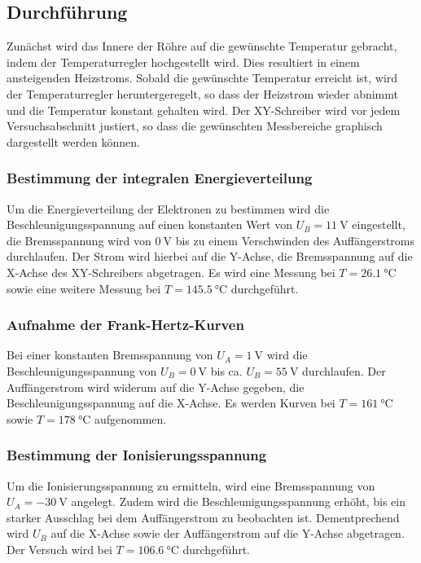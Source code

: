 \subsection{Durchführung}
\label{sec:durchführung}
Zunächst wird das Innere der Röhre auf die gewünschte Temperatur gebracht, indem der Temperaturregler hochgestellt wird.
Dies resultiert in einem ansteigenden Heizstroms.
Sobald die gewünschte Temperatur erreicht ist, wird der Temperaturregler heruntergeregelt, so dass der Heizstrom wieder abnimmt und die Temperatur konstant gehalten wird.
Der XY-Schreiber wird vor jedem Versuchsabschnitt justiert, so dass die gewünschten Messbereiche graphisch dargestellt werden können.

\subsubsection{Bestimmung der integralen Energieverteilung}
Um die Energieverteilung der Elektronen zu bestimmen wird die Beschleunigungsspannung auf einen konstanten Wert von $U_B = \SI{11}{\volt}$ eingestellt, die Bremsspannung wird von $\SI{0}{\volt}$ bis zu einem Verschwinden des Auffängerstroms durchlaufen.
Der Strom wird hierbei auf die Y-Achse, die Bremsspannung auf die X-Achse des XY-Schreibers abgetragen.
Es wird eine Messung bei $T = \SI{26.1}{\celsius}$ sowie eine weitere Messung bei $T = \SI{145.5}{\celsius}$ durchgeführt.

\subsubsection{Aufnahme der Frank-Hertz-Kurven}
Bei einer konstanten Bremsspannung von $U_A = \SI{1}{\volt}$ wird die Beschleunigungsspannung von $U_B = \SI{0}{\volt}$ bis ca. $U_B = \SI{55}{\volt}$ durchlaufen.
Der Auffängerstrom wird widerum auf die Y-Achse gegeben, die Beschleunigungsspannung auf die X-Achse.
Es werden Kurven bei $T = \SI{161}{\celsius}$ sowie $T = \SI{178}{\celsius}$ aufgenommen.

\subsubsection{Bestimmung der Ionisierungsspannung}
Um die Ionisierungsspannung zu ermitteln, wird eine Bremsspannung von $U_A = \SI{-30}{\volt}$ angelegt.
Zudem wird die Beschleunigungsspannung erhöht, bis ein starker Ausschlag bei dem Auffängerstrom zu beobachten ist.
Dementprechend wird $U_B$ auf die X-Achse sowie der Auffängerstrom auf die Y-Achse abgetragen.
Der Versuch wird bei $T = \SI{106.6}{\celsius}$ durchgeführt.
